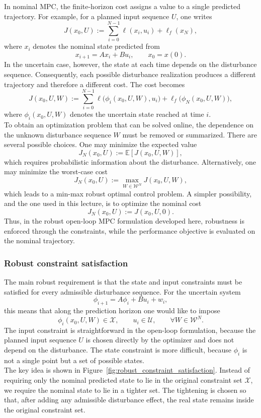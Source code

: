 In nominal MPC, the finite-horizon cost assigns a value to a single predicted trajectory. For
example, for a planned input sequence \(U\), one writes
\[
    J(x_0,U)
    :=
    \sum_{i=0}^{N-1} \ell(x_i,u_i) + \ell_f(x_N),
\]
where \(x_i\) denotes the nominal state predicted from
\[
    x_{i+1}=Ax_i+Bu_i,
    \qquad x_0=x(0).
\]
In the uncertain case, however, the state at each time depends on the disturbance sequence.
Consequently, each possible disturbance realization produces a different trajectory and therefore
a different cost. The cost becomes
\[
    J(x_0,U,W)
    :=
    \sum_{i=0}^{N-1}
    \ell\bigl(\phi_i(x_0,U,W),u_i\bigr)
    +
    \ell_f\bigl(\phi_N(x_0,U,W)\bigr),
\]
where \(\phi_i(x_0,U,W)\) denotes the uncertain state reached at time \(i\).\\
To obtain an optimization problem that can be solved online, the dependence on the unknown
disturbance sequence \(W\) must be removed or summarized. There are several possible choices.
One may minimize the expected value
\[
    J_N(x_0,U)
    :=
    \mathbb E\left[J(x_0,U,W)\right],
\]
which requires probabilistic information about the disturbance. Alternatively, one may minimize
the worst-case cost
\[
    J_N(x_0,U)
    :=
    \max_{W\in\mathcal W^N} J(x_0,U,W),
\]
which leads to a min-max robust optimal control problem. A simpler possibility, and the one
used in this lecture, is to optimize the nominal cost
\[
    J_N(x_0,U)
    :=
    J(x_0,U,0).
\]
Thus, in the robust open-loop MPC formulation developed here, robustness is enforced through
the constraints, while the performance objective is evaluated on the nominal trajectory.

\subsubsection{Robust constraint satisfaction}

The main robust requirement is that the state and input constraints must be satisfied for every
admissible disturbance sequence. For the uncertain system
\[
    \phi_{i+1}=A\phi_i+Bu_i+w_i,
\]
this means that along the prediction horizon one would like to impose
\[
    \phi_i(x_0,U,W)\in\mathcal X,
    \qquad
    u_i\in\mathcal U,
    \qquad
    \forall W\in\mathcal W^N.
\]
The input constraint is straightforward in the open-loop formulation, because the planned input
sequence \(U\) is chosen directly by the optimizer and does not depend on the disturbance.
The state constraint is more difficult, because \(\phi_i\) is not a single point but a set of
possible states.\\
The key idea is shown in Figure~\ref{fig:robust_constraint_satisfaction}. Instead of requiring
only the nominal predicted state to lie in the original constraint set \(\mathcal X\), we require
the nominal state to lie in a tighter set. The tightening is chosen so that, after adding any
admissible disturbance effect, the real state remains inside the original constraint set.

